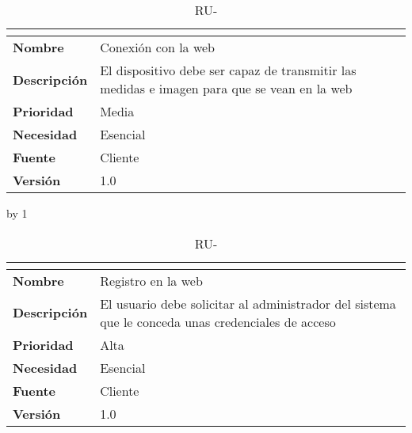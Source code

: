 \begin{table}[H]
	\caption{RU-\number\ru}
	\begin{tabular}{|l|p{}|}
		\hline
		\multicolumn{2}{|c|}{\cellcolor[HTML]{BFBFBF}{\color[HTML]{000000} \textbf{RU-\number\ru}}} \\ \hline
		\textbf{Nombre}      & Conexión con la web                                                                          \\ \hline
		\textbf{Descripción} & El dispositivo debe ser capaz de transmitir las medidas e imagen para que se vean  en la web \\ \hline
		\textbf{Prioridad}   & Media                                                                                        \\ \hline
		\textbf{Necesidad}   & Esencial                                                                                     \\ \hline
		\textbf{Fuente}      & Cliente                                                                                      \\ \hline
		\textbf{Versión}     & 1.0                                                                                          \\ \hline
	\end{tabular}
\end{table}
\advance\ru by 1
\begin{table}[H]
	\caption{RU-\number\ru}
	\begin{tabular}{|l|p{}|}
		\hline
		\multicolumn{2}{|c|}{\cellcolor[HTML]{BFBFBF}{\color[HTML]{000000} \textbf{RU-\number\ru}}} \\ \hline
		\textbf{Nombre}      & Registro en la web                                                                                \\ \hline
		\textbf{Descripción} & El usuario debe solicitar al administrador del sistema que le conceda unas credenciales de acceso \\ \hline
		\textbf{Prioridad}   & Alta                                                                                              \\ \hline
		\textbf{Necesidad}   & Esencial                                                                                          \\ \hline
		\textbf{Fuente}      & Cliente                                                                                           \\ \hline
		\textbf{Versión}     & 1.0                                                                                               \\ \hline
	\end{tabular}
\end{table}

